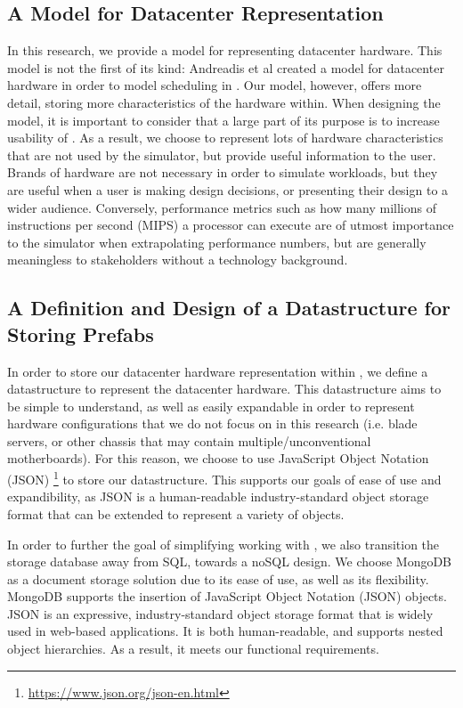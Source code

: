 \documentclass[11pt]{article}
\begin{document}

	\subsection{A Model for Datacenter Representation}
		In this research, we provide a model for representing datacenter hardware. 
		This model is not the first of its kind: Andreadis et al created a model for datacenter hardware in order to model scheduling in \opendc{} \cite{Andreadis2018}. 
		Our model, however, offers more detail, storing more characteristics of the hardware within.
		When designing the model, it is important to consider that a large part of its purpose is to increase usability of \opendc{}. 
		As a result, we choose to represent lots of hardware characteristics that are not used by the simulator, but provide useful information to the user. 
		Brands of hardware are not necessary in order to simulate workloads, but they are useful when a user is making design decisions, or presenting their design to a wider audience.
		Conversely, performance metrics such as how many millions of instructions per second (MIPS) a processor can execute are of utmost importance to the simulator when extrapolating performance numbers, but are generally meaningless to stakeholders without a technology background.
	
	\subsection{A Definition and Design of a Datastructure for Storing Prefabs}
		In order to store our datacenter hardware representation within \opendc{}, we define a datastructure to represent the datacenter hardware. 
		This datastructure aims to be simple to understand, as well as easily expandable in order to represent hardware configurations that we do not focus on in this research (i.e. blade servers, or other chassis that may contain multiple/unconventional motherboards). 
		For this reason, we choose to use JavaScript Object Notation (JSON) \footnote{\url{https://www.json.org/json-en.html}} to store our datastructure. 
		This supports our goals of ease of use and expandibility, as JSON is a human-readable industry-standard object storage format that can be extended to represent a variety of objects.

		In order to further the goal of simplifying working with \opendc{}, we also transition the storage database away from SQL, towards a noSQL design.
		We choose MongoDB as a document storage solution due to its ease of use, as well as its flexibility.
		MongoDB supports the insertion of JavaScript Object Notation (JSON) objects.
		JSON is an expressive, industry-standard object storage format that is widely used in web-based applications.
		It is both human-readable, and supports nested object hierarchies.
		As a result, it meets our functional requirements.
\end{document}
